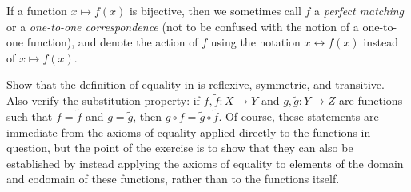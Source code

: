 \setcounter{thm}{22}
\begin{rmk}\label{i:3.3.23}
  If a function \(x \mapsto f(x)\) is bijective, then we sometimes call \(f\) a \emph{perfect matching} or a \emph{one-to-one correspondence} (not to be confused with the notion of a one-to-one function), and denote the action of \(f\) using the notation \(x \leftrightarrow f(x)\) instead of \(x \mapsto f(x)\).
\end{rmk}

\exercisesection

\begin{ex}\label{i:ex:3.3.1}
  Show that the definition of equality in  is reflexive, symmetric, and transitive.
  Also verify the substitution property: if \(f, \tilde{f} : X \to Y\) and \(g, \tilde{g} : Y \to Z\) are functions such that \(f = \tilde{f}\) and \(g = \tilde{g}\), then \(g \circ f = \tilde{g} \circ \tilde{f}\).
  Of course, these statements are immediate from the axioms of equality applied directly to the functions in question, but the point of the exercise is to show that they can also be established by instead applying the axioms of equality to elements of the domain and codomain of these functions, rather than to the functions itself.
\end{ex}

